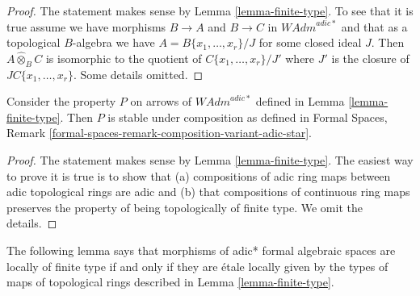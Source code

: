 \begin{proof}
The statement makes sense by Lemma \ref{lemma-finite-type}.
To see that it is true assume we have morphisms
$B \to A$ and $B \to C$ in $\textit{WAdm}^{adic*}$
and that as a topological $B$-algebra we have
$A = B\{x_1, \ldots, x_r\}/J$ for some closed ideal $J$.
Then $A \widehat{\otimes}_B C$ is isomorphic to the
quotient of $C\{x_1, \ldots, x_r\}/J'$ where
$J'$ is the closure of $JC\{x_1, \ldots, x_r\}$.
Some details omitted.
\end{proof}

\begin{lemma}
\label{lemma-composition-finite-type}
Consider the property $P$ on arrows of $\textit{WAdm}^{adic*}$ defined in
Lemma \ref{lemma-finite-type}. Then $P$ is stable under composition as
defined in Formal Spaces, Remark
\ref{formal-spaces-remark-composition-variant-adic-star}.
\end{lemma}

\begin{proof}
The statement makes sense by Lemma \ref{lemma-finite-type}.
The easiest way to prove it is true is to show that
(a) compositions of adic ring maps between adic topological rings
are adic and (b) that compositions of continuous ring maps
preserves the property of being topologically of finite type.
We omit the details.
\end{proof}

\noindent
The following lemma says that morphisms of adic* formal algebraic spaces
are locally of finite type if and only if they are \'etale locally given
by the types of maps of topological rings described in
Lemma \ref{lemma-finite-type}.

